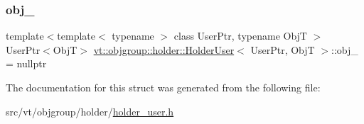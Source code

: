 \subsubsection{\texorpdfstring{obj\+\_\+}{obj\_}}
{\footnotesize\ttfamily template$<$template$<$ typename $>$ class User\+Ptr, typename ObjT $>$ \\
User\+Ptr$<$ObjT$>$ \hyperlink{structvt_1_1objgroup_1_1holder_1_1_holder_user}{vt\+::objgroup\+::holder\+::\+Holder\+User}$<$ User\+Ptr, ObjT $>$\+::obj\+\_\+ = nullptr\hspace{0.3cm}{\ttfamily [private]}}



The documentation for this struct was generated from the following file\+:\begin{DoxyCompactItemize}
\item 
src/vt/objgroup/holder/\hyperlink{holder__user_8h}{holder\+\_\+user.\+h}\end{DoxyCompactItemize}

